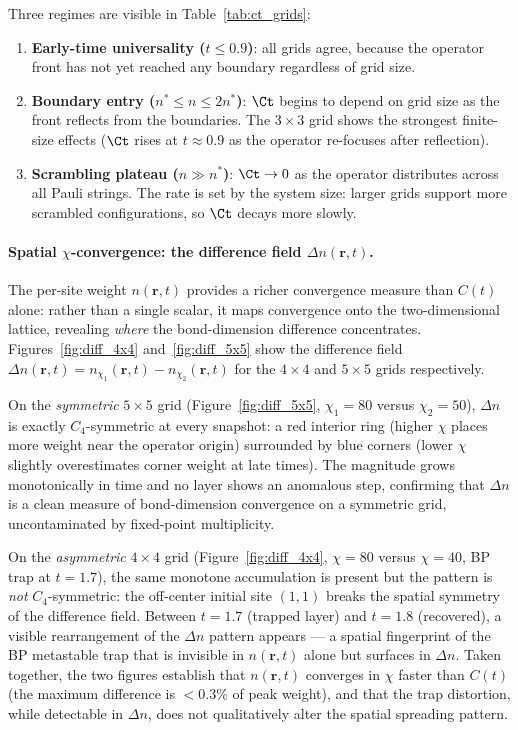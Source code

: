 Three regimes are visible in Table~\ref{tab:ct_grids}:
\begin{enumerate}
  \item \textbf{Early-time universality ($t \leq 0.9$)}: all grids agree, because
        the operator front has not yet reached any boundary regardless of grid size.
  \item \textbf{Boundary entry ($n^* \leq n \leq 2n^*$)}: $\Ct$ begins to depend
        on grid size as the front reflects from the boundaries.
        The $3\times3$ grid shows the strongest finite-size effects ($\Ct$ rises
        at $t \approx 0.9$ as the operator re-focuses after reflection).
  \item \textbf{Scrambling plateau ($n \gg n^*$)}: $\Ct \to 0$ as the operator
        distributes across all Pauli strings.
        The rate is set by the system size: larger grids support more scrambled
        configurations, so $\Ct$ decays more slowly.
\end{enumerate}

\paragraph{Spatial $\chi$-convergence: the difference field $\Delta n(\mathbf{r},t)$.}
The per-site weight $n(\mathbf{r},t)$ provides a richer convergence measure than
$C(t)$ alone: rather than a single scalar, it maps convergence onto the
two-dimensional lattice, revealing \emph{where} the bond-dimension difference
concentrates.
Figures~\ref{fig:diff_4x4} and~\ref{fig:diff_5x5} show the difference field
$\Delta n(\mathbf{r},t) = n_{\chi_1}(\mathbf{r},t) - n_{\chi_2}(\mathbf{r},t)$
for the $4\times4$ and $5\times5$ grids respectively.

On the \emph{symmetric} $5\times5$ grid (Figure~\ref{fig:diff_5x5},
$\chi_1=80$ versus $\chi_2=50$), $\Delta n$ is exactly $C_4$-symmetric at every
snapshot: a red interior ring (higher $\chi$ places more weight near the operator
origin) surrounded by blue corners (lower $\chi$ slightly overestimates corner
weight at late times).
The magnitude grows monotonically in time and no layer shows an anomalous step,
confirming that $\Delta n$ is a clean measure of bond-dimension convergence
on a symmetric grid, uncontaminated by fixed-point multiplicity.

On the \emph{asymmetric} $4\times4$ grid (Figure~\ref{fig:diff_4x4},
$\chi=80$ versus $\chi=40$, BP trap at $t=1.7$), the same monotone accumulation
is present but the pattern is \emph{not} $C_4$-symmetric: the off-center initial
site $(1,1)$ breaks the spatial symmetry of the difference field.
Between $t=1.7$ (trapped layer) and $t=1.8$ (recovered), a visible rearrangement
of the $\Delta n$ pattern appears --- a spatial fingerprint of the BP metastable
trap that is invisible in $n(\mathbf{r},t)$ alone but surfaces in $\Delta n$.
Taken together, the two figures establish that $n(\mathbf{r},t)$ converges in
$\chi$ faster than $C(t)$ (the maximum difference is ${<}0.3\%$ of peak weight),
and that the trap distortion, while detectable in $\Delta n$, does not qualitatively
alter the spatial spreading pattern.

